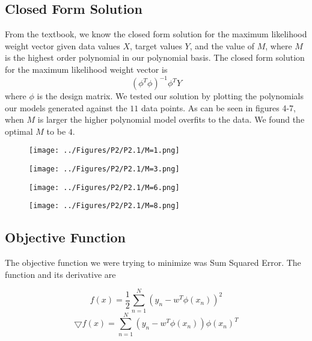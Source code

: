 \documentclass[a4paper,twoside]{article}
\begin{document}
\subsection{Closed Form Solution}

From the textbook, we know the closed form solution for the maximum likelihood weight vector given data values $X$, target values $Y$, and the value of $M$, where $M$ is the highest order polynomial in our polynomial basis. The closed form solution for the maximum likelihood weight vector is
\begin{equation}
(\phi^T \phi)^{-1} \phi^T Y
\end{equation}
where $\phi$ is the design matrix. We tested our solution by plotting the polynomials our models generated against the $11$ data points. As can be seen in figures 4-7, when $M$ is larger the higher polynomial model overfits to the data. We found the optimal $M$ to be $4$.

\begin{figure}[h]
  \texttt{[image: ../Figures/P2/P2.1/M=1.png]}
  \caption{}
  \label{fig:gradient_converging}
\end{figure}

\begin{figure}[h]
  \texttt{[image: ../Figures/P2/P2.1/M=3.png]}
  \caption{}
  \label{fig:gradient_converging}
\end{figure}

\begin{figure}[h]
  \texttt{[image: ../Figures/P2/P2.1/M=6.png]}
  \caption{}
  \label{fig:gradient_converging}
\end{figure}

\begin{figure}[h]
  \texttt{[image: ../Figures/P2/P2.1/M=8.png]}
  \caption{}
  \label{fig:gradient_converging}
\end{figure}

\subsection{Objective Function}

The objective function we were trying to minimize was Sum Squared Error. The function and its derivative are 

\begin{equation}
f(x) = \frac{1}{2} \sum_{n=1}^{N} (y_n - w^T \phi(x_n))^2
\end{equation}
\begin{equation}
\bigtriangledown f(x) = \sum_{n=1}^{N} (y_n - w^T \phi(x_n)) \phi(x_n)^T
\end{equation}
\end{document}
